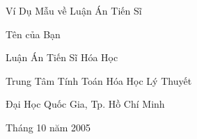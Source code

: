 \documentclass[a4paper,12pt]{report}
\begin{document}
\begin{titlepage}
\begin{center}
\vspace*{1in}
{\LARGE Ví Dụ Mẫu về Luận Án Tiến Sĩ}
\par
\vspace{1.5in}
{\large Tên của Bạn}
\par
\vfill
Luận Án Tiến Sĩ Hóa Học
\par
\vspace{0.5in}
Trung Tâm Tính Toán Hóa Học Lý Thuyết
\par
\vspace{0.5in}
Đại Học Quốc Gia, Tp. Hồ Chí Minh
\par
\vspace{0.5in}
Tháng 10 năm 2005
\end{center}
\end{titlepage}
\end{document}
